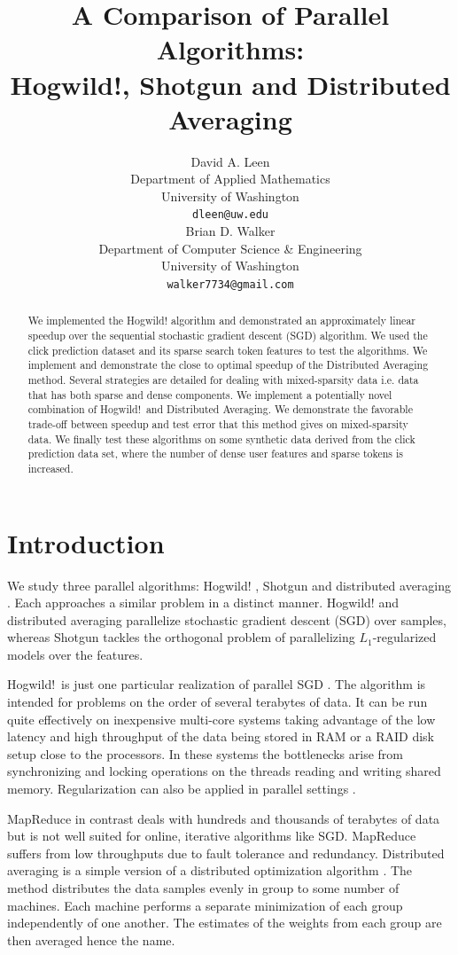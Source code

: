 \documentclass{article} %
\title{A Comparison of Parallel Algorithms:\\ {\Large Hogwild!, Shotgun and Distributed Averaging}}
\author{
David A. Leen \\
Department of Applied Mathematics\\
University of Washington \\
\texttt{dleen@uw.edu} \\
\And
Brian D. Walker \\
Department of Computer Science \& Engineering \\
University of Washington \\
\texttt{walker7734@gmail.com} \\
}
\begin{document}
\maketitle

\begin{abstract}
We implemented the Hogwild! algorithm and demonstrated an approximately linear speedup over the
sequential stochastic gradient descent (SGD) algorithm.  We used the click prediction dataset and its sparse search token features to test the algorithms. We implement and demonstrate the close to optimal speedup of the Distributed Averaging method. Several strategies are detailed for dealing with mixed-sparsity data i.e. data that has both sparse and dense components. We implement a potentially novel combination of Hogwild!~and Distributed Averaging. We demonstrate the favorable trade-off between speedup and test error that this method gives on mixed-sparsity data. We finally test these algorithms on some synthetic data derived from the click prediction data set, where the number of dense user features and sparse tokens is increased.
\end{abstract}

\section{Introduction}
We study three parallel algorithms: Hogwild! \cite{niu2011hogwild}, Shotgun \cite{bradley2011parallel} and distributed averaging \cite{zhang2012comunication}. Each approaches a similar problem in a distinct manner. Hogwild! and distributed averaging parallelize stochastic gradient descent (SGD) over samples, whereas Shotgun tackles the orthogonal problem of parallelizing $L_1$-regularized models over the features.

Hogwild!~is just one particular realization of parallel SGD \cite{niu2011hogwild, zinkevich2010parallelized}. The algorithm is intended for problems on the order of several terabytes of data. It can be run quite effectively on inexpensive multi-core systems taking advantage of the low latency and high throughput of the data being stored in RAM or a RAID disk setup close to the processors. In these systems the bottlenecks arise from synchronizing and locking operations on the threads reading and writing shared memory. Regularization can also be applied in parallel settings \cite{langford2009slow, agarwal2011distributed}.

MapReduce in contrast deals with hundreds and thousands of terabytes of data but is not well suited for online, iterative algorithms like SGD. MapReduce suffers from low throughputs due to fault tolerance and redundancy. Distributed averaging is a simple version of a distributed optimization algorithm \cite{dekel2012optimal, agarwal2011distributed}. The method distributes the data samples evenly in group to some number of machines. Each machine performs a separate minimization of each group independently of one another. The estimates of the weights from each group are then averaged hence the name.
\end{document}
